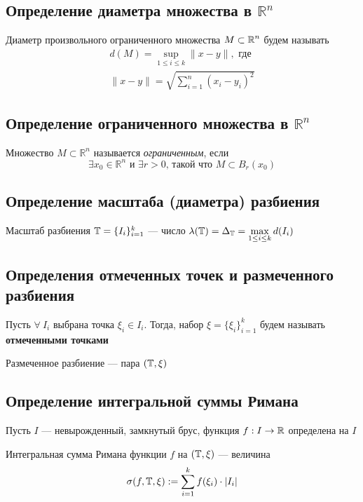 \documentclass[a4paper]{article}
\begin{document}
\subsection{Определение диаметра множества в $\mathbb{R}^n$}
 Диаметр произвольного ограниченного множества $M\subset\operatorname{\mathbb{R}}^n$ будем называть 
\begin{equation*}
\begin{aligned}
    d(M) = \displaystyle\sup_{1\leqslant i\leqslant k}\|x-y\|,\text{ где}\\
    \|x-y\|=\sqrt{\sum_{i=1}^{n}\left(x_i-y_i\right)^2}
\end{aligned}
\end{equation*}

\subsection{Определение ограниченного множества в $\mathbb{R}^n$}
 Множество $M\subset \mathbb{R}^n$ называется \textit{ограниченным}, если $$\exists x_0\in\mathbb{R}^n\text{ и }\exists r>0\text{, такой что }M\subset B_{r}(x_0)$$

\subsection{Определение масштаба (диаметра) разбиения}
 Масштаб разбиения $\operatorname{\mathbb{T}}=\{I_i\}_{i=1}^k$ — число $\lambda(\operatorname{\mathbb{T}}) = \Delta_{\operatorname{\mathbb{T}}} = \displaystyle\max_{1\le i\le k} d(I_i)$

\subsection{Определения отмеченных точек и размеченного разбиения}
 Пусть $\forall\ I_i$ выбрана точка $\xi_i\in I_i$. Тогда, набор $\xi = \{\xi_i\}_{i=1}^k$ будем называть \textbf{отмеченными точками}

 Размеченное разбиение — пара $(\operatorname{\mathbb{T}}, \xi)$

\subsection{Определение интегральной суммы Римана}
Пусть $I$ — невырожденный, замкнутый брус, функция $f: I\rightarrow \operatorname{\mathbb{R}}$ определена на $I$

 \label{1.8} Интегральная сумма Римана функции $f$ на $(\operatorname{\mathbb{T}}, \xi)$ — величина
$$\sigma(f, \T, \xi) := \sum_{i=1}^kf(\xi_i)\cdot|I_i|$$
\end{document}
